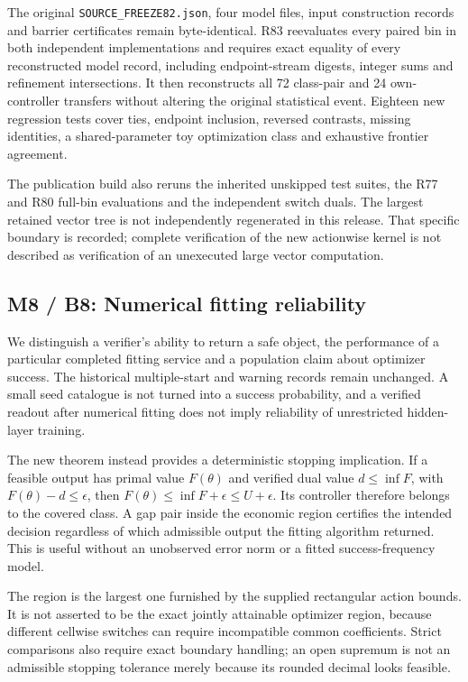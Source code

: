 The original \texttt{SOURCE\_FREEZE82.json}, four model files, input
construction records and barrier certificates remain byte-identical. R83
reevaluates every paired bin in both independent implementations and
requires exact equality of every reconstructed model record, including
endpoint-stream digests, integer sums and refinement intersections. It
then reconstructs all 72 class-pair and 24 own-controller transfers
without altering the original statistical event. Eighteen new regression
tests cover ties, endpoint inclusion, reversed contrasts, missing
identities, a shared-parameter toy optimization class and exhaustive
frontier agreement.

The publication build also reruns the inherited unskipped test suites,
the R77 and R80 full-bin evaluations and the independent switch duals.
The largest retained vector tree is not independently regenerated in
this release. That specific boundary is recorded; complete verification
of the new actionwise kernel is not described as verification of an
unexecuted large vector computation.

\hypertarget{m8-b8-numerical-fitting-reliability}{%
\subsection{M8 / B8: Numerical fitting
reliability}\label{m8-b8-numerical-fitting-reliability}}

We distinguish a verifier's ability to return a safe object, the
performance of a particular completed fitting service and a population
claim about optimizer success. The historical multiple-start and warning
records remain unchanged. A small seed catalogue is not turned into a
success probability, and a verified readout after numerical fitting does
not imply reliability of unrestricted hidden-layer training.

The new theorem instead provides a deterministic stopping implication.
If a feasible output has primal value \(F(\theta)\) and verified dual
value \(d\le\inf F\), with \(F(\theta)-d\le\epsilon\), then
\(F(\theta)\le\inf F+\epsilon\le U+\epsilon\). Its controller therefore
belongs to the covered class. A gap pair inside the economic region
certifies the intended decision regardless of which admissible output
the fitting algorithm returned. This is useful without an unobserved
error norm or a fitted success-frequency model.

The region is the largest one furnished by the supplied rectangular
action bounds. It is not asserted to be the exact jointly attainable
optimizer region, because different cellwise switches can require
incompatible common coefficients. Strict comparisons also require exact
boundary handling; an open supremum is not an admissible stopping
tolerance merely because its rounded decimal looks feasible.

